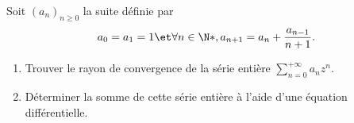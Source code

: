 \begin{enonce}
\begin{exercise}[ID={RMS 121-2 E792},subtitle={},tags={}, difficulty={0}]
  Soit $(a_n)_{n\ge0}$ la suite définie par
  \begin{equation*}
    a_0=a_1=1 \et \forall n\in\N*, a_{n+1}=a_n+\frac{a_{n-1}}{n+1}.
  \end{equation*}
  \begin{enumerate}
	\item Trouver le rayon de convergence de la série entière $\sum\limits_{n=0}^{+\infty} a_n z^n$.
	\item Déterminer la somme de cette série entière à l'aide d'une équation différentielle.
  \end{enumerate}
\end{exercise}
\begin{solution}
\end{solution}
\end{enonce}
